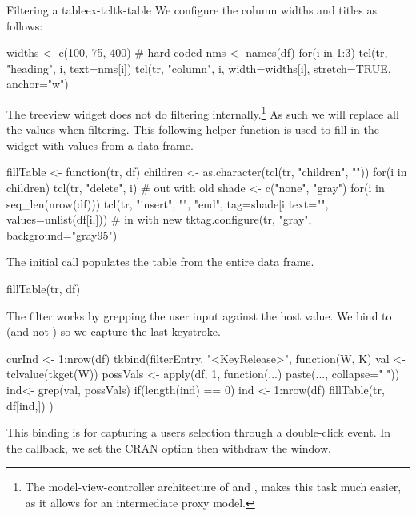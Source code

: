 \begin{example}{Filtering a table}{ex-tcltk-table}
We configure the column widths and titles as follows:
\begin{Schunk}
\begin{Sinput}
 widths <- c(100, 75, 400)            # hard coded
 nms <- names(df)
 for(i in 1:3) {
   tcl(tr, "heading", i, text=nms[i])
   tcl(tr, "column", i, width=widths[i], 
       stretch=TRUE, anchor="w")
 }
\end{Sinput}
\end{Schunk}
%
The treeview widget does not do filtering internally.\footnote{The
  model-view-controller architecture of \GTK{} and \Qt, makes this task
  much easier, as it allows for an intermediate proxy model.} As such
we will replace all the values when filtering.  This following helper
function is used to fill in the widget with values from a data frame.
\begin{Schunk}
\begin{Sinput}
 fillTable <- function(tr, df) {
   children <- as.character(tcl(tr, "children", ""))
   for(i in children) tcl(tr, "delete", i)    # out with old
   shade <- c("none", "gray")
   for(i in seq_len(nrow(df))) 
     tcl(tr, "insert", "", "end", tag=shade[i %
         text="",  
         values=unlist(df[i,]))               # in with new
   tktag.configure(tr, "gray", background="gray95")
 }
\end{Sinput}
\end{Schunk}
%
The initial call populates the table from the entire data frame.
\begin{Schunk}
\begin{Sinput}
 fillTable(tr, df)
\end{Sinput}
\end{Schunk}

The filter works by grepping the user input against the host value. We
bind to  (and not ) so we capture the last keystroke.
\begin{Schunk}
\begin{Sinput}
 curInd <- 1:nrow(df)
 tkbind(filterEntry, "<KeyRelease>", function(W, K) {
   val <- tclvalue(tkget(W))
   possVals <- apply(df, 1, function(...) 
                     paste(..., collapse=" "))
   ind<- grep(val, possVals)
   if(length(ind) == 0) ind <- 1:nrow(df)
   fillTable(tr, df[ind,])
 })
\end{Sinput}
\end{Schunk}
%
This binding is for capturing a users selection through a double-click
event. In the callback, we set the CRAN option then withdraw the window.
\begin{Schunk}
\end{Schunk}
\end{example}

